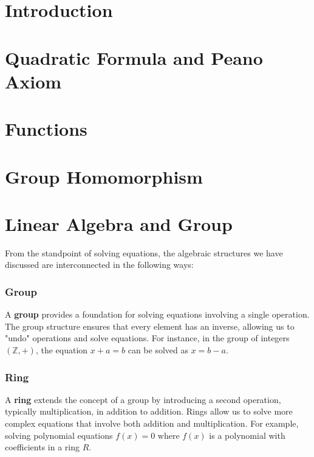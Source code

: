 \documentclass[12pt,openany]{book}
\begin{document}
	
	
	\tableofcontents
	\newpage
	\chapter{Introduction}
	
	
	\newpage
	\chapter{Quadratic Formula and Peano Axiom}
	
	
	\newpage
	\chapter{Functions}
	
	
	\newpage
	\chapter{Group Homomorphism}
	
	
	\newpage
	\chapter{Linear Algebra and Group}
	
	
	From the standpoint of solving equations, the algebraic structures we have discussed are interconnected in the following ways:
	
	\subsection*{Group}
	A \textbf{group} provides a foundation for solving equations involving a single operation. The group structure ensures that every element has an inverse, allowing us to "undo" operations and solve equations. For instance, in the group of integers \( (\mathbb{Z}, +) \), the equation \( x + a = b \) can be solved as \( x = b - a \).
	
	\subsection*{Ring}
	A \textbf{ring} extends the concept of a group by introducing a second operation, typically multiplication, in addition to addition. Rings allow us to solve more complex equations that involve both addition and multiplication. For example, solving polynomial equations \( f(x) = 0 \) where \( f(x) \) is a polynomial with coefficients in a ring \( R \).
	
\end{document}
